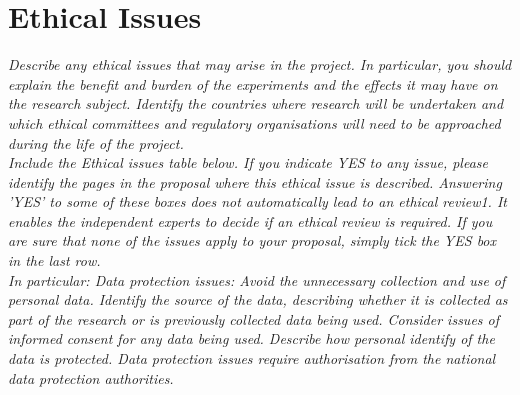\documentclass[a4paper,11pt,twoside]{scrreprt}
\newcommand{\commissionhints}[1]{\small \textit{#1}}
\begin{document}
\chapter{Ethical Issues}\label{chap:ethical}
\commissionhints{ %
  Describe any ethical issues that may arise in the project. In particular, you should
  explain the benefit and burden of the experiments and the effects it may have on the
  research subject. Identify the countries where research will be undertaken and which
  ethical committees and regulatory organisations will need to be approached during the
  life of the project.
\\
  Include the Ethical issues table below.  If you indicate YES to any issue, please
  identify the pages in the proposal where this ethical issue is described. Answering
  'YES' to some of these boxes does not automatically lead to an ethical review1.  It
  enables the independent experts to decide if an ethical review is required. If you are
  sure that none of the issues apply to your proposal, simply tick the YES box in the last
  row.
\\
In particular: Data protection issues: Avoid the unnecessary collection and use of
personal data. Identify the source of the data, describing whether it
is collected as part of the research or is previously collected data
being used. Consider issues of informed consent for any data being
used. Describe how personal identify of the data is protected. Data
protection issues require authorisation from the national data
protection authorities. 
}
\end{document}
